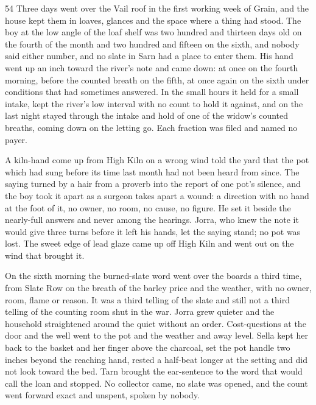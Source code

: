 \begin{CRchronicle}{54}
Three days went over the Vail roof in the first working week of Grain, and the house kept them in loaves, glances and the space where a thing had stood. The boy at the low angle of the loaf shelf was two hundred and thirteen days old on the fourth of the month and two hundred and fifteen on the sixth, and nobody said either number, and no slate in Sarn had a place to enter them. His hand went up an inch toward the river’s note and came down: at once on the fourth morning, before the counted breath on the fifth, at once again on the sixth under conditions that had sometimes answered. In the small hours it held for a small intake, kept the river’s low interval with no count to hold it against, and on the last night stayed through the intake and hold of one of the widow’s counted breaths, coming down on the letting go. Each fraction was filed and named no payer.

A kiln-hand come up from High Kiln on a wrong wind told the yard that the pot which had sung before its time last month had not been heard from since. The saying turned by a hair from a proverb into the report of one pot’s silence, and the boy took it apart as a surgeon takes apart a wound: a direction with no hand at the foot of it, no owner, no room, no cause, no figure. He set it beside the nearly-full answers and never among the hearings. Jorra, who knew the note it would give three turns before it left his hands, let the saying stand; no pot was lost. The sweet edge of lead glaze came up off High Kiln and went out on the wind that brought it.

On the sixth morning the burned-slate word went over the boards a third time, from Slate Row on the breath of the barley price and the weather, with no owner, room, flame or reason. It was a third telling of the slate and still not a third telling of the counting room shut in the war. Jorra grew quieter and the household straightened around the quiet without an order. Cost-questions at the door and the well went to the pot and the weather and away level. Sella kept her back to the basket and her finger above the charcoal, set the pot handle two inches beyond the reaching hand, rested a half-beat longer at the setting and did not look toward the bed. Tarn brought the ear-sentence to the word that would call the loan and stopped. No collector came, no slate was opened, and the count went forward exact and unspent, spoken by nobody.
\end{CRchronicle}
